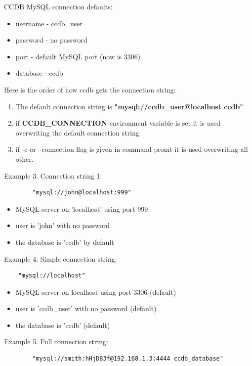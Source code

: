 \documentclass{article}
\begin{document}
CCDB MySQL connection defaults:
\begin{itemize}
  \item username - ccdb\_user
  \item password - no password
  \item port - default MySQL port (now is 3306)
  \item database - ccdb
\end{itemize}


Here is the order of how ccdb gets the connection string:
\begin{enumerate}
  \item The default connection string is  \textbf{"mysql://ccdb\_user@localhost ccdb"}

  \item if \textbf{CCDB\_CONNECTION} environment variable is set it is used overwriting
        the default connection string

  \item if -c or --connection flag is given in command promt it is used overwriting
        all other.
\end{enumerate}

Example 3. Connection string 1:

\begin{verbatim}
        "mysql://john@localhost:999"
\end{verbatim}


\begin{itemize}
  \item MySQL server on 'localhost' using port 999
  \item user is 'john' with no password
  \item the database is 'ccdb' by default
\end{itemize}

Example 4. Simple connection string:
\begin{verbatim}	
	"mysql://localhost"
\end{verbatim}

\begin{itemize}
  \item MySQL server on localhost using port 3306 (default)
  \item user is 'ccdb\_user' with no password (default)
  \item the database is 'ccdb' (default)
\end{itemize}


Example 5. Full connection string:
\begin{verbatim}	
        "mysql://smith:hHjD83f@192.168.1.3:4444 ccdb_database"
\end{verbatim}
\end{document}
